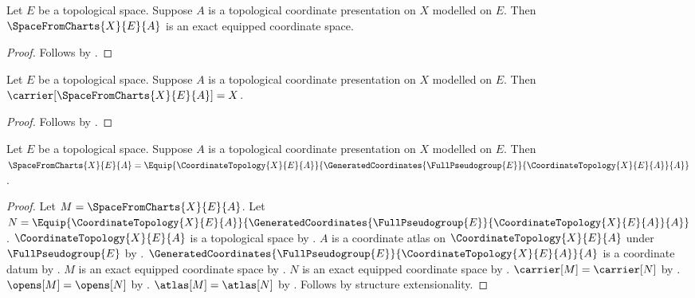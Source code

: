 \begin{theorem}\label{space_from_charts_is_exact}
    Let $E$ be a topological space.
    Suppose $A$ is a topological coordinate presentation on $X$ modelled on $E$.
    Then $\SpaceFromCharts{X}{E}{A}$ is an exact equipped coordinate space.
\end{theorem}
\begin{proof}
    Follows by .
\end{proof}

\begin{theorem}\label{space_from_charts_carrier}
    Let $E$ be a topological space.
    Suppose $A$ is a topological coordinate presentation on $X$ modelled on $E$.
    Then $\carrier[\SpaceFromCharts{X}{E}{A}]=X$.
\end{theorem}
\begin{proof}
    Follows by .
\end{proof}

\begin{theorem}\label{space_from_charts_equipment}
    Let $E$ be a topological space.
    Suppose $A$ is a topological coordinate presentation on $X$ modelled on $E$.
    Then $\SpaceFromCharts{X}{E}{A}
        =\Equip{\CoordinateTopology{X}{E}{A}}
            {\GeneratedCoordinates{\FullPseudogroup{E}}{\CoordinateTopology{X}{E}{A}}{A}}$.
\end{theorem}
\begin{proof}
    Let $M=\SpaceFromCharts{X}{E}{A}$.
    Let $N=\Equip{\CoordinateTopology{X}{E}{A}}
        {\GeneratedCoordinates{\FullPseudogroup{E}}{\CoordinateTopology{X}{E}{A}}{A}}$.
    $\CoordinateTopology{X}{E}{A}$ is a topological space by
        .
    $A$ is a coordinate atlas on $\CoordinateTopology{X}{E}{A}$ under
        $\FullPseudogroup{E}$ by .
    $\GeneratedCoordinates{\FullPseudogroup{E}}{\CoordinateTopology{X}{E}{A}}{A}$
        is a coordinate datum by .
    $M$ is an exact equipped coordinate space by .
    $N$ is an exact equipped coordinate space by .
    $\carrier[M]=\carrier[N]$ by
        .
    $\opens[M]=\opens[N]$ by
        .
    $\atlas[M]=\atlas[N]$ by
        .
    Follows by structure extensionality.
\end{proof}

